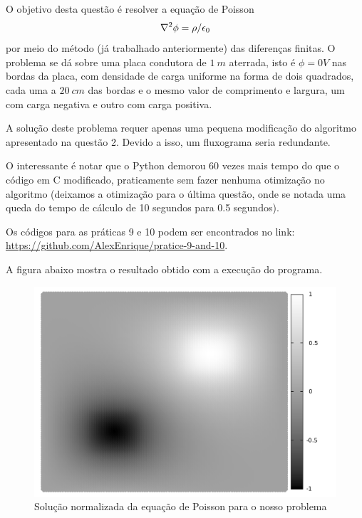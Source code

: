 



  O objetivo desta questão é resolver a equação de Poisson
  \begin{equation*}
    \laplacian{\phi} = \rho / \epsilon_0
  \end{equation*}
  por meio do método (já trabalhado anteriormente) das diferenças finitas. O problema se dá sobre uma placa condutora de $1 \ m$ aterrada, isto é $\phi = 0 V$ nas bordas da placa, com densidade de carga uniforme na forma de dois quadrados, cada uma a $20 \ cm$ das bordas e o mesmo valor de comprimento e largura, um com carga negativa e outro com carga positiva.

  A solução deste problema requer apenas uma pequena modificação do algoritmo apresentado na questão 2. Devido a isso, um fluxograma seria redundante.

  O interessante é notar que o Python demorou 60 vezes mais tempo do que o código em C modificado, praticamente sem fazer nenhuma otimização no algoritmo (deixamos a otimização para o última questão, onde se notada uma queda do tempo de cálculo de 10 segundos para 0.5 segundos).

  Os códigos para as práticas 9 e 10 podem ser encontrados no link: \url{https://github.com/AlexEnrique/pratice-9-and-10}.

  A figura abaixo mostra o resultado obtido com a execução do programa.

  \begin{figure}[h]
    \center
    \includegraphics[scale = .4]{../q3/q3Fig}
    \caption{Solução normalizada da equação de Poisson para o nosso problema}
  \end{figure}







